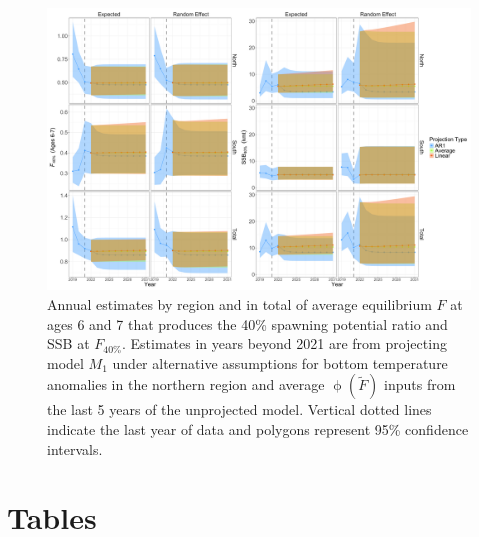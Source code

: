 \documentclass[
]{article}
\begin{document}
\begin{landscape}

\begin{figure}

{\centering \includegraphics[height=0.95\textheight]{proj_brps} 

}

\caption{Annual estimates by region and in total of average equilibrium $F$ at ages 6 and 7 that produces the 40\% spawning potential ratio and SSB at $F_{40\%}$. Estimates in years beyond 2021 are from projecting model $M_1$ under alternative assumptions for bottom temperature anomalies in the northern region and average $\upphi(\widetilde{F})$ inputs from the last 5 years of the unprojected model. Vertical dotted lines indicate the last year of data and polygons represent 95\% confidence intervals.}\label{fig:brps-proj}
\end{figure}

\end{landscape}

\clearpage

\setcounter{table}{0}
\renewcommand\thetable{\arabic{table}}

\hypertarget{tables}{%
\section*{Tables}\label{tables}}
\end{document}
